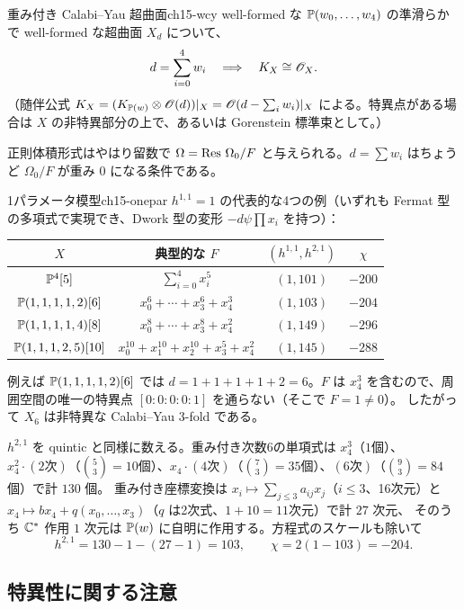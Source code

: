 \begin{myprop}{重み付き Calabi--Yau 超曲面}{ch15-wcy}
well-formed な $\mathbb{P}(w_0,\dots,w_4)$ の準滑らかで well-formed な超曲面 $X_d$ について、
\[
d = \sum_{i=0}^4 w_i\quad\Longrightarrow\quad K_X\cong\mathscr{O}_X .
\]
（随伴公式 $K_X = (K_{\mathbb{P}(w)}\otimes\mathscr{O}(d))|_X = \mathscr{O}(d - \sum_iw_i)|_X$ による。特異点がある場合は $X$ の非特異部分の上で、あるいは Gorenstein 標準束として。）
\end{myprop}

正則体積形式はやはり留数で $\Omega = \operatorname{Res}\,\Omega_0/F$ と与えられる。$d=\sum w_i$ はちょうど $\Omega_0/F$ が重み $0$ になる条件である。

\begin{myex}{1パラメータ模型}{ch15-onepar}
$h^{1,1}=1$ の代表的な4つの例（いずれも Fermat 型の多項式で実現でき、Dwork 型の変形 $-d\psi\prod x_i$ を持つ）：
\begin{center}
\renewcommand{\arraystretch}{1.3}
\begin{tabular}{c|c|c|c}
$X$ & 典型的な $F$ & $(h^{1,1},h^{2,1})$ & $\chi$\\ \hline
$\mathbb{P}^4[5]$ & $\sum_{i=0}^4x_i^5$ & $(1,101)$ & $-200$\\
$\mathbb{P}(1,1,1,1,2)[6]$ & $x_0^6+\cdots+x_3^6+x_4^3$ & $(1,103)$ & $-204$\\
$\mathbb{P}(1,1,1,1,4)[8]$ & $x_0^8+\cdots+x_3^8+x_4^2$ & $(1,149)$ & $-296$\\
$\mathbb{P}(1,1,1,2,5)[10]$ & $x_0^{10}+x_1^{10}+x_2^{10}+x_3^5+x_4^2$ & $(1,145)$ & $-288$\\
\end{tabular}
\end{center}
例えば $\mathbb{P}(1,1,1,1,2)[6]$ では $d = 1+1+1+1+2 = 6$。$F$ は $x_4^3$ を含むので、周囲空間の唯一の特異点 $[0:0:0:0:1]$ を通らない（そこで $F = 1\ne0$）。
したがって $X_6$ は非特異な Calabi--Yau 3-fold である。

$h^{2,1}$ を quintic と同様に数える。重み付き次数6の単項式は
$x_4^3$（$1$個）、$x_4^2\cdot(\text{2次})$（$\binom{5}{3}=10$個）、$x_4\cdot(\text{4次})$（$\binom{7}{3}=35$個）、$(\text{6次})$（$\binom{9}{3} = 84$個）で計 $130$ 個。
重み付き座標変換は $x_i\mapsto\sum_{j\le3}a_{ij}x_j$（$i\le3$、16次元）と $x_4\mapsto bx_4 + q(x_0,\dots,x_3)$（$q$ は2次式、$1+10 = 11$次元）で計 $27$ 次元、
そのうち $\mathbb{C}^*$ 作用 $1$ 次元は $\mathbb{P}(w)$ に自明に作用する。方程式のスケールも除いて
\[
h^{2,1} = 130 - 1 - (27-1) = 103,\qquad \chi = 2(1-103) = -204 .
\]
\end{myex}

\subsection{特異性に関する注意}

